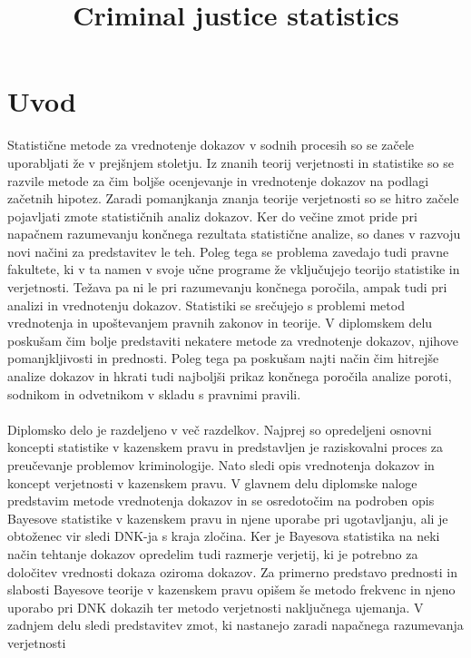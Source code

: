 \documentclass[fin1, tisk]{fmfdelo}
\title{Criminal justice statistics}
\theoremstyle{definition}
\theoremstyle{trditev}
\theoremstyle{izrek}
\begin{document}
\nocite{collins,byers,aitkena,hoff,aitkenb,aitkenc,aitkend,bello,berger,conklin,dahlman,fentona,fentonb,finkelstein,gastwirth,giannini,glover,iliinski,maarcot,macedo,maddan,matthews,orban,schumana,schumanb,scurich,balaba,blankenship,skorupski,balding,bidermann,tarling}

\section{Uvod}
Statistične metode za vrednotenje dokazov v sodnih procesih so se začele uporabljati že v prejšnjem stoletju. Iz znanih teorij verjetnosti in
statistike so se razvile metode za čim boljše ocenjevanje in vrednotenje dokazov na podlagi začetnih hipotez. Zaradi pomanjkanja znanja teorije
verjetnosti so se hitro začele pojavljati zmote statističnih analiz dokazov. Ker do večine zmot pride pri napačnem razumevanju končnega rezultata
statistične analize, so danes v razvoju novi načini za predstavitev le teh. Poleg tega se problema zavedajo tudi pravne fakultete, ki v ta namen v svoje učne
programe že vključujejo teorijo statistike in verjetnosti. Težava pa ni le pri razumevanju končnega poročila, ampak tudi pri analizi in vrednotenju
dokazov. Statistiki se srečujejo s problemi metod vrednotenja in upoštevanjem pravnih zakonov in teorije. V diplomskem delu poskušam
čim bolje predstaviti nekatere metode za vrednotenje dokazov, njihove pomanjkljivosti in prednosti. Poleg tega pa poskušam najti način čim hitrejše
analize dokazov in hkrati tudi najboljši prikaz končnega poročila analize poroti, sodnikom in odvetnikom v skladu s pravnimi pravili.\\\\
Diplomsko delo je razdeljeno v več razdelkov. Najprej so opredeljeni osnovni koncepti statistike v kazenskem pravu in predstavljen je 
raziskovalni proces za preučevanje problemov kriminologije. Nato sledi opis vrednotenja dokazov in koncept verjetnosti v kazenskem 
pravu. V glavnem delu diplomske naloge predstavim metode vrednotenja dokazov in se osredotočim na podroben opis Bayesove statistike 
v kazenskem pravu in njene uporabe pri ugotavljanju, ali je obtoženec vir sledi DNK-ja s kraja zločina. Ker je Bayesova statistika 
na neki način tehtanje dokazov opredelim tudi razmerje verjetij, ki je potrebno za določitev vrednosti dokaza oziroma dokazov. Za 
primerno predstavo prednosti in slabosti Bayesove teorije v kazenskem pravu opišem še metodo frekvenc in njeno uporabo pri DNK dokazih 
ter metodo verjetnosti naključnega ujemanja. V zadnjem delu sledi predstavitev zmot, ki nastanejo zaradi napačnega razumevanja verjetnosti 
\end{document}
